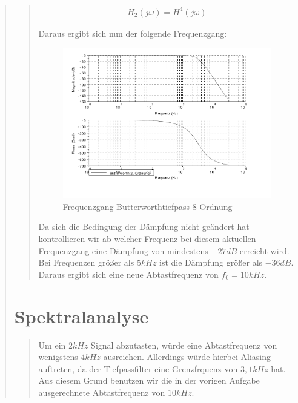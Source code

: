 \begin{quote}
\begin{quote}
        \begin{equation*}
        	\begin{split}
        		H_2(j\omega) = H^4 (j\omega)
        	\end{split}
        \end{equation*}
        
        Daraus ergibt sich nun der folgende Frequenzgang:
        
        \begin{figure}[H]
			\centering
				\includegraphics[scale=1]{Frequenzgang8Ordnung}
				   \caption{Frequenzgang Butterworthtiefpass 8 Ordnung}
		\end{figure}
		\vspace{1em}
	 	
	 	Da sich die Bedingung der Dämpfung nicht geändert hat kontrollieren wir ab welcher Frequenz bei diesem aktuellen
	 	Frequenzgang eine Dämpfung von mindestens $-27 dB$ erreicht wird.\\
	 	Bei Frequenzen größer als $5kHz$ ist die Dämpfung größer als $-36 dB$. Daraus ergibt sich eine neue Abtastfrequenz
	 	von $f_0 = 10kHz$.
    \end{quote}
    
    \section{Spektralanalyse}
    \begin{quote}
    	Um ein $2kHz$ Signal abzutasten, würde eine Abtastfrequenz von wenigstens $4 kHz$ ausreichen. Allerdings würde
    	hierbei Aliasing auftreten, da der Tiefpassfilter eine Grenzfrquenz von
    	$3,1kHz$ hat.\\
    	Aus diesem Grund benutzen wir die in der vorigen Aufgabe ausgerechnete Abtastfrequenz von $10kHz$.
    \end{quote}
\end{quote}

